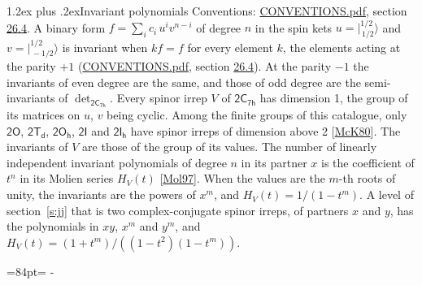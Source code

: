 \documentclass[10pt,a4paper]{article}
\makeatletter
\renewcommand\section{\@startsection{section}{1}{\z@}{-3ex plus -1ex minus -.2ex}%
  {1.2ex plus .2ex}{\normalfont\large\sffamily\bfseries\color{parttitle}}}
\newcommand{\needspace}[1]{\par\penalty-100\begingroup\dimen0=#1\relax\dimen2=\pagegoal
  \advance\dimen2-\pagetotal\ifdim\dimen0>\dimen2\relax\ifdim\dimen2>0pt\vfil\break\fi\fi
  \endgroup}
\numberwithin{equation}{section}
\newcommand{\grp}[1]{\mathsf{#1}}
\newcommand{\jm}[2]{\bigl\lvert{}^{#1}_{\,#2}\bigr\rangle}
\makeatother
\begin{document}
\section{Invariant polynomials}\label{s:invariants}
Conventions: \href{../../CONVENTIONS.pdf}{CONVENTIONS.pdf}, section \href{../../CONVENTIONS.pdf\#conv.26.4}{26.4}.
\leavevmode\label{n:local.binary.form}A binary form $f = \sum_i c_i\, u^i v^{n-i}$ of degree $n$ in the spin kets $u = \jm{1/2}{1/2}$ and $v = \jm{1/2}{-1/2}$ is invariant when $k f = f$ for every element $k$, the elements acting at the parity $+1$ (\href{../../CONVENTIONS.pdf}{CONVENTIONS.pdf}, section \href{../../CONVENTIONS.pdf\#conv.26.4}{26.4}). At the parity $-1$ the invariants of even degree are the same, and those of odd degree are the semi-invariants of $\det_{\grp{2C_{7h}}}$.
\leavevmode\label{n:function.hilbert}Every spinor irrep $V$ of $\grp{2C_{7h}}$ has dimension 1, the group of its matrices on $u$, $v$ being cyclic. Among the finite groups of this catalogue, only $\grp{2O}$, $\grp{2T_{d}}$, $\grp{2O_{h}}$, $\grp{2I}$ and $\grp{2I_{h}}$ have spinor irreps of dimension above 2 [\href{../../../REFERENCES.pdf\#ref.McK80}{McK80}]. The invariants of $V$ are those of the group of its values. \label{n:local.partner.x}The number of linearly independent invariant polynomials of degree $n$ in its partner $x$ is the coefficient of $t^n$ in its Molien series $H_V(t)$ [\href{../../../REFERENCES.pdf\#ref.Mol97}{Mol97}]. When the values are the $m$-th roots of unity, the invariants are the powers of $x^{m}$, and $H_V(t) = 1/(1 - t^{m})$. A level of section~\ref{s:jj} that is two complex-conjugate spinor irreps, of partners $x$ and $y$, has the polynomials in $xy$, $x^{m}$ and $y^{m}$, and $H_V(t) = (1 + t^{m})/((1 - t^{2})(1 - t^{m}))$.
\needspace{84pt}
\end{document}
